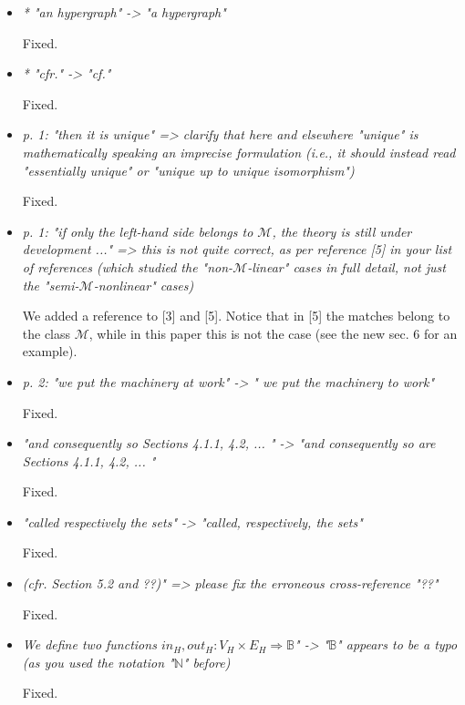 \documentclass[english,11pt,a4paper]{article}
\begin{document}
\begin{itemize}
	\item \emph{* "an hypergraph" -> "a hypergraph"}
	
	Fixed.
	
	\item \emph{* "cfr." -> "cf."}
	
	Fixed.
	
	\item \emph{ p. 1: "then it is unique" => clarify that here and elsewhere "unique" is mathematically speaking an imprecise formulation (i.e., it should instead read "essentially unique" or "unique up to unique isomorphism")}
	
	Fixed.
	
	
	\item \emph{p. 1: "if only the left-hand side belongs to $\mathcal{M}$, the theory is still under development ..." => this is not quite correct, as per reference [5] in your list of references (which studied the "non-$\mathcal{M}$-linear" cases in full detail, not just the "semi-$\mathcal{M}$-nonlinear" cases)}
	
	We added a reference to [3] and [5]. Notice that in [5] the matches belong to the class $\mathcal{M}$, while in this paper this is not the case (see the new sec. $6$ for an example).
	
	\item \emph{p. 2: "we put the machinery at work" -> " we put the machinery to work"}
	
	Fixed.
	
	\item \emph{ "and consequently so Sections 4.1.1, 4.2, ... " -> "and consequently so are Sections 4.1.1, 4.2, ... "}
	
	Fixed.
	
	
	\item \emph{ "called respectively the sets" -> "called, respectively, the sets"}
	
	Fixed.
	
	
	\item \emph{(cfr. Section 5.2 and ??)" => please fix the erroneous cross-reference "??"}
	
	Fixed.
	
	\item \emph{We define two functions $in_H, out_H : V_H \times E_H \Rightarrow \mathbb{B}$" -> "$\mathbb{B}$" appears to be a typo (as you used the notation "$\mathbb{N}$" before)}
	
	Fixed.
	

\end{itemize}
\end{document}
